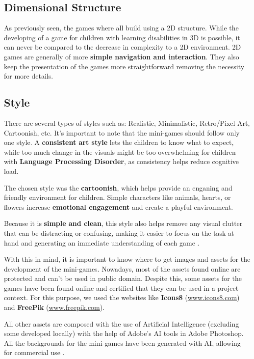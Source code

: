 \subsection*{Dimensional Structure}
As previously seen, the games where all build using a 2D structure. While the developing of a game for children with learning disabilities in 3D is possible, it can never be compared to the decrease in complexity to a 2D environment. 2D games are generally of more \textbf{simple navigation and interaction}. They also keep the presentation of the games more straightforward removing the necessity for more details.

\subsection*{Style}
There are several types of styles such as: Realistic, Minimalistic, Retro/Pixel-Art, Cartoonish, etc.
It's important to note that the mini-games should follow only one style. A \textbf{consistent art style} lets the children to know what to expect, while too much change in the visuals might be too overwhelming for children with \textbf{Language Processing Disorder}, as consistency helps reduce cognitive load.

The chosen style was the \textbf{cartoonish}, which helps provide an enganing and friendly environment for children. Simple characters like animals, hearts, or flowers increase \textbf{emotional engagement} and create a playful environment.

Because it is \textbf{simple and clean}, this style also helps remove any visual clutter that can be distracting or confusing, making it easier to focus on the task at hand and generating an immediate understanding of each game \cite{brady2012apps}.

With this in mind, it is important to know where to get images and assets for the development of the mini-games. Nowadays, most of the assets found online are protected and can't be used in public domain. Despite this, some assets for the games have been found online and certified that they can be used in a project context. For this purpose, we used the websites like \textbf{Icons8} (\url{www.icons8.com}) and \textbf{FreePik} (\url{www.freepik.com}).

All other assets are composed with the use of Artificial Intelligence (excluding some developed locally) with the help of Adobe's AI tools in Adobe Photoshop. All the backgrounds for the mini-games have been generated with AI, allowing for commercial use \cite{adobeGuidelines}.


